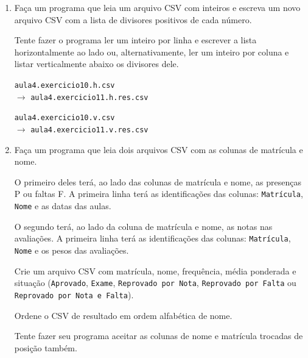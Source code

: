 \begin{enumerate}
	Tente fazer o programa ler um inteiro por linha e escrever a lista horizontalmente ao lado ou, alternativamente, ler um inteiro por coluna e listar verticalmente abaixo os fatores primos dele.
	
	\texttt{aula4.exercicio10.h.csv} 
	\\ $\rightarrow$
	\texttt{aula4.exercicio10.h.res.csv}
	
	\texttt{aula4.exercicio10.v.csv} 
	\\ $\rightarrow$
	\texttt{aula4.exercicio10.v.res.csv}
	
\quebra	
	
	\item Faça um programa que leia um arquivo CSV com inteiros e escreva um novo arquivo CSV com a lista de divisores positivos de cada número.
	
	Tente fazer o programa ler um inteiro por linha e escrever a lista horizontalmente ao lado ou, alternativamente, ler um inteiro por coluna e listar verticalmente abaixo os divisores dele.
	
	\texttt{aula4.exercicio10.h.csv} 
	\\ $\rightarrow$
	\texttt{aula4.exercicio11.h.res.csv}
	
	\texttt{aula4.exercicio10.v.csv} 
	\\ $\rightarrow$
	\texttt{aula4.exercicio11.v.res.csv}

\quebra	

	\item Faça um programa que leia dois arquivos CSV com as colunas de matrícula e nome. 
	
	O primeiro deles terá, ao lado das colunas de matrícula e nome, as presenças P ou faltas F.
	A primeira linha terá as identificações das colunas: \texttt{Matrícula}, \texttt{Nome} e as datas das aulas.
	
	O segundo terá, ao lado da coluna de matrícula e nome, as notas nas avaliações.
	A primeira linha terá as identificações das colunas: \texttt{Matrícula}, \texttt{Nome} e os pesos das avaliações.
	
	Crie um arquivo CSV com matrícula, nome, frequência, média ponderada e situação (\texttt{Aprovado}, \texttt{Exame}, \texttt{Reprovado por Nota}, \texttt{Reprovado por Falta} ou \texttt{Reprovado por Nota e Falta}).
	
	Ordene o CSV de resultado em ordem alfabética de nome.
	
	Tente fazer seu programa aceitar as colunas de nome e matrícula trocadas de posição também.
	

\end{enumerate}
